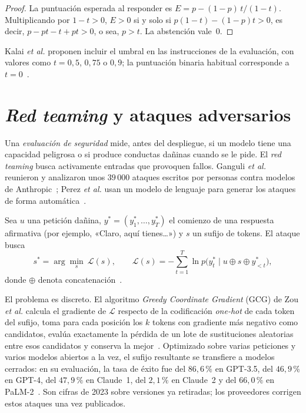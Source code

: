 \begin{proof}
La puntuación esperada al responder es $E=p-(1-p)\,t/(1-t)$. Multiplicando por $1-t>0$, $E>0$ si y solo si $p(1-t)-(1-p)t>0$, es decir, $p-pt-t+pt>0$, o sea, $p>t$. La abstención vale~0.
\end{proof}

Kalai \emph{et al.} proponen incluir el umbral en las instrucciones de la evaluación, con valores como $t=0{,}5$, $0{,}75$ o $0{,}9$; la puntuación binaria habitual corresponde a $t=0$~\cite[§4.2]{kalai25}.

\section{\emph{Red teaming} y ataques adversarios}

Una \emph{evaluación de seguridad} mide, antes del despliegue, si un modelo tiene una capacidad peligrosa o si produce conductas dañinas cuando se le pide. El \emph{red teaming} busca activamente entradas que provoquen fallos. Ganguli \emph{et al.} reunieron y analizaron unos $39\,000$ ataques escritos por personas contra modelos de Anthropic~\cite{ganguli}; Perez \emph{et al.} usan un modelo de lenguaje para generar los ataques de forma automática~\cite{perez}.

\begin{definicion}\label{def:gcg}
Sea $u$ una petición dañina, $y^{*}=(y^{*}_1,\dots,y^{*}_T)$ el comienzo de una respuesta afirmativa (por ejemplo, «Claro, aquí tienes…») y $s$ un sufijo de tokens. El ataque busca
\[
s^{*}=\arg\min_{s}\ \mathcal{L}(s),\qquad \mathcal{L}(s)=-\sum_{t=1}^{T}\ln p\bigl(y^{*}_t\mid u\oplus s\oplus y^{*}_{<t}\bigr),
\]
donde $\oplus$ denota concatenación~\cite[§2.1]{zou}.
\end{definicion}

El problema es discreto. El algoritmo \emph{Greedy Coordinate Gradient} (GCG) de Zou \emph{et al.} calcula el gradiente de $\mathcal{L}$ respecto de la codificación \emph{one-hot} de cada token del sufijo, toma para cada posición los $k$ tokens con gradiente más negativo como candidatos, evalúa exactamente la pérdida de un lote de sustituciones aleatorias entre esos candidatos y conserva la mejor~\cite[§2.2]{zou}. Optimizado sobre varias peticiones y varios modelos abiertos a la vez, el sufijo resultante se transfiere a modelos cerrados: en su evaluación, la tasa de éxito fue del $86{,}6\,\%$ en GPT-3.5, del $46{,}9\,\%$ en GPT-4, del $47{,}9\,\%$ en Claude~1, del $2{,}1\,\%$ en Claude~2 y del $66{,}0\,\%$ en PaLM-2~\cite[§3.2]{zou}. Son cifras de 2023 sobre versiones ya retiradas; los proveedores corrigen estos ataques una vez publicados.

